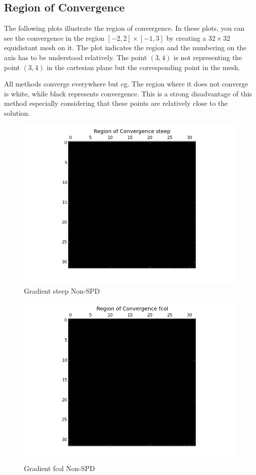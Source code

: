 \documentclass{article}
\begin{document}
\subsection{Region of Convergence}
The following plots illustrate the region of convergence.
In these plots, you can see the convergence in the region $[-2,2]\times [-1,3]$ by creating a $32\times 32$ equidistant mesh
on it.  The plot indicates the region and the numbering on the axis has to be understood relatively. The point $(3,4)$ 
is not representing the point $(3,4)$ in the cartesian plane but the corresponding point in the mesh. \par
All methods converge everywhere but cg. The region where it does not converge is white, while black represents convergence.
This is a strong disadvantage of this method especially considering that these points are relatively close to the solution.
\begin{figure}[H]
  \centering
  \includegraphics[scale=0.5]{steepregion.png}
  \caption{Gradient steep Non-SPD}
\end{figure}
\begin{figure}[H]
  \centering
  \includegraphics[scale=0.5]{fcolregion.png}
  \caption{Gradient fcol Non-SPD}
\end{figure}
\end{document}
